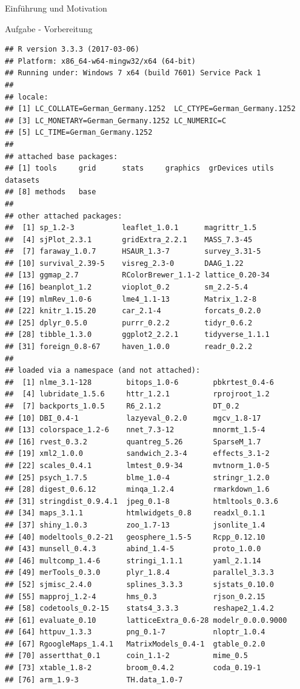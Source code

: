 \documentclass[ignorenonframetext,]{beamer}
\begin{document}
\begin{frame}[fragile]{Einführung und Motivation}
\begin{block}{Aufgabe - Vorbereitung}
\begin{verbatim}
## R version 3.3.3 (2017-03-06)
## Platform: x86_64-w64-mingw32/x64 (64-bit)
## Running under: Windows 7 x64 (build 7601) Service Pack 1
## 
## locale:
## [1] LC_COLLATE=German_Germany.1252  LC_CTYPE=German_Germany.1252   
## [3] LC_MONETARY=German_Germany.1252 LC_NUMERIC=C                   
## [5] LC_TIME=German_Germany.1252    
## 
## attached base packages:
## [1] tools     grid      stats     graphics  grDevices utils     datasets 
## [8] methods   base     
## 
## other attached packages:
##  [1] sp_1.2-3           leaflet_1.0.1      magrittr_1.5      
##  [4] sjPlot_2.3.1       gridExtra_2.2.1    MASS_7.3-45       
##  [7] faraway_1.0.7      HSAUR_1.3-7        survey_3.31-5     
## [10] survival_2.39-5    visreg_2.3-0       DAAG_1.22         
## [13] ggmap_2.7          RColorBrewer_1.1-2 lattice_0.20-34   
## [16] beanplot_1.2       vioplot_0.2        sm_2.2-5.4        
## [19] mlmRev_1.0-6       lme4_1.1-13        Matrix_1.2-8      
## [22] knitr_1.15.20      car_2.1-4          forcats_0.2.0     
## [25] dplyr_0.5.0        purrr_0.2.2        tidyr_0.6.2       
## [28] tibble_1.3.0       ggplot2_2.2.1      tidyverse_1.1.1   
## [31] foreign_0.8-67     haven_1.0.0        readr_0.2.2       
## 
## loaded via a namespace (and not attached):
##  [1] nlme_3.1-128        bitops_1.0-6        pbkrtest_0.4-6     
##  [4] lubridate_1.5.6     httr_1.2.1          rprojroot_1.2      
##  [7] backports_1.0.5     R6_2.1.2            DT_0.2             
## [10] DBI_0.4-1           lazyeval_0.2.0      mgcv_1.8-17        
## [13] colorspace_1.2-6    nnet_7.3-12         mnormt_1.5-4       
## [16] rvest_0.3.2         quantreg_5.26       SparseM_1.7        
## [19] xml2_1.0.0          sandwich_2.3-4      effects_3.1-2      
## [22] scales_0.4.1        lmtest_0.9-34       mvtnorm_1.0-5      
## [25] psych_1.7.5         blme_1.0-4          stringr_1.2.0      
## [28] digest_0.6.12       minqa_1.2.4         rmarkdown_1.6      
## [31] stringdist_0.9.4.1  jpeg_0.1-8          htmltools_0.3.6    
## [34] maps_3.1.1          htmlwidgets_0.8     readxl_0.1.1       
## [37] shiny_1.0.3         zoo_1.7-13          jsonlite_1.4       
## [40] modeltools_0.2-21   geosphere_1.5-5     Rcpp_0.12.10       
## [43] munsell_0.4.3       abind_1.4-5         proto_1.0.0        
## [46] multcomp_1.4-6      stringi_1.1.1       yaml_2.1.14        
## [49] merTools_0.3.0      plyr_1.8.4          parallel_3.3.3     
## [52] sjmisc_2.4.0        splines_3.3.3       sjstats_0.10.0     
## [55] mapproj_1.2-4       hms_0.3             rjson_0.2.15       
## [58] codetools_0.2-15    stats4_3.3.3        reshape2_1.4.2     
## [61] evaluate_0.10       latticeExtra_0.6-28 modelr_0.0.0.9000  
## [64] httpuv_1.3.3        png_0.1-7           nloptr_1.0.4       
## [67] RgoogleMaps_1.4.1   MatrixModels_0.4-1  gtable_0.2.0       
## [70] assertthat_0.1      coin_1.1-2          mime_0.5           
## [73] xtable_1.8-2        broom_0.4.2         coda_0.19-1        
## [76] arm_1.9-3           TH.data_1.0-7
\end{verbatim}


\end{block}
\end{frame}
\end{document}
